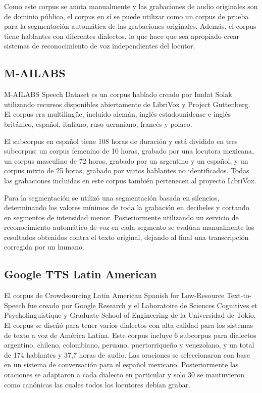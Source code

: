 Como este corpus se anota manualmente y las grabaciones de audio originales son de dominio público, el corpus en sí se puede utilizar como un corpus de prueba para la segmentación automática de las grabaciones originales. Además, el corpus tiene hablantes con diferentes dialectos, lo que hace que sea apropiado crear sistemas de reconocimiento de voz independientes del locutor.

\subsection{M-AILABS}

M-AILABS Speech Dataset \cite{M-AILABS} es un corpus hablado creado por Imdat Solak utilizando recursos disponibles abiertamente de LibriVox y Project Guttenberg. El corpus era multilingüe, incluido alemán, inglés estadounidense e inglés británico, español, italiano, ruso ucraniano, francés y polaco.

El subcorpus en español tiene 108 horas de duración y está  dividido en tres subcorpus: un corpus femenino de 10 horas, grabado por una locutora mexicana, un corpus masculino de 72 horas, grabado por un argentino y un español, y un corpus mixto de 25 horas, grabado por varios hablantes no identificados. Todas las grabaciones incluidas en este corpus también pertenecen al proyecto LibriVox.

Para la segmentación se utilizó una segmentación basada en silencios, determinando los valores mínimos de toda la grabación en decibeles y cortando en segmentos de intensidad menor. Posteriormente utilizando un servicio de reconocimiento automático de voz en cada segmento se evalúan manualmente los resultados obtenidos contra el texto original, dejando al final una transcripción corregida por un humano.



\subsection{Google TTS Latin American}

El corpus de Crowdsourcing Latin American Spanish for Low-Resource Text-to-Speech \cite{googleTTSLatinAmericanSpanishCorpus} fue creado por Google Research y el Laboratoire de Sciences Cognitives et Psycholinguistique y Graduate School of Engineering de la Universidad de Tokio. El corpus se diseñó para tener varios dialectos con alta calidad para los sistemas de texto a voz de América Latina. Este corpus incluye 6 subcorpus para dialectos argentino, chileno, colombiano, peruano, puertorriqueño y venezolano, y un total de 174 hablantes y 37,7 horas de audio. Las oraciones se seleccionaron con base en un sistema de conversación para el español mexicano. Posteriormente las oraciones se adaptaron a cada dialecto en particular y solo 30 se mantuvieron como canónicas las cuales todos los locutores debían grabar.

